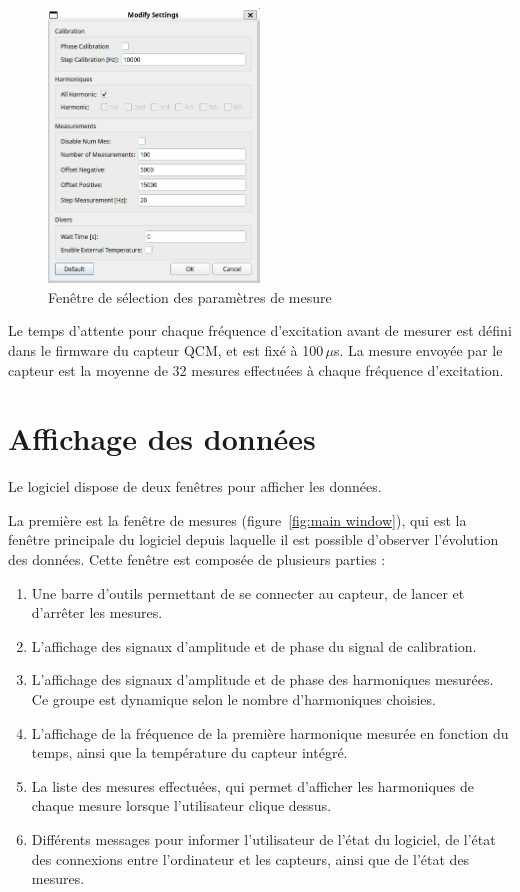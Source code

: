 \begin{figure}[H]
    \centering
    \includegraphics[width=0.5\textwidth]{assets/figures/DefaultSettings.png}
    \caption{Fenêtre de sélection des paramètres de mesure}
    \label{fig:paramerter window}
\end{figure}

Le temps d'attente pour chaque fréquence d'excitation avant de mesurer est défini dans le firmware du capteur QCM, et est fixé à 100 $\mu $s.
La mesure envoyée par le capteur est la moyenne de 32 mesures effectuées à chaque fréquence d'excitation.
\newpage
\section{Affichage des données} 

Le logiciel dispose de deux fenêtres pour afficher les données.

La première est la fenêtre de mesures (figure~\ref{fig:main window}), qui est la fenêtre principale du logiciel depuis laquelle il est possible d'observer l'évolution des données.  
Cette fenêtre est composée de plusieurs parties :

\begin{enumerate}
    \item Une barre d'outils permettant de se connecter au capteur, de lancer et d'arrêter les mesures.
    \item L'affichage des signaux d'amplitude et de phase du signal de calibration.
    \item L'affichage des signaux d'amplitude et de phase des harmoniques mesurées. Ce groupe est dynamique selon le nombre d'harmoniques choisies.
    \item L'affichage de la fréquence de la première harmonique mesurée en fonction du temps, ainsi que la température du capteur intégré.
    \item La liste des mesures effectuées, qui permet d'afficher les harmoniques de chaque mesure lorsque l'utilisateur clique dessus.
    \item Différents messages pour informer l'utilisateur de l'état du logiciel, de l'état des connexions entre l'ordinateur et les capteurs, ainsi que de l'état des mesures.
\end{enumerate}

